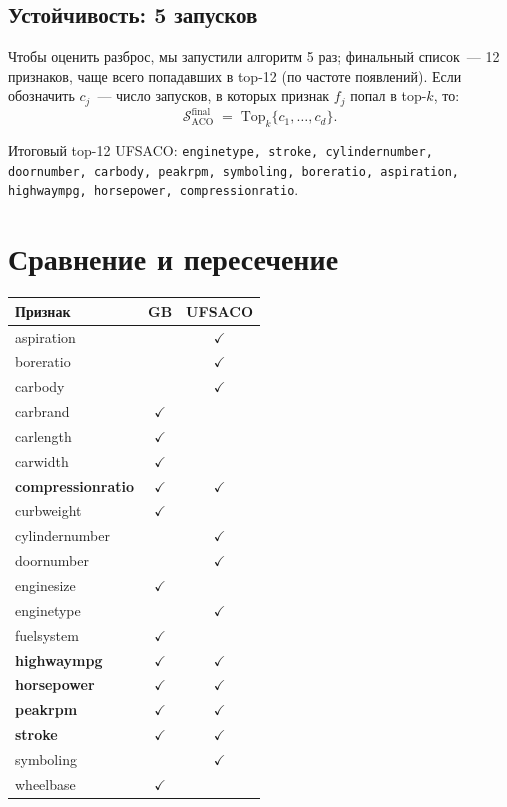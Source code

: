 \documentclass[12pt,a4paper]{article}
\begin{document}
\subsection{Устойчивость: 5 запусков}

Чтобы оценить разброс, мы запустили алгоритм 5 раз; финальный
список~--- 12 признаков, чаще всего попадавших в top-12 (по частоте
появлений). Если обозначить $c_j$~--- число запусков, в которых
признак $f_j$ попал в top-$k$, то:
\begin{equation}
  \mathcal{S}_{\text{ACO}}^{\text{final}}
    \;=\; \mathrm{Top}_k\bigl\{c_1, \dots, c_d\bigr\}.
\end{equation}

Итоговый top-12 UFSACO:
\texttt{enginetype, stroke, cylindernumber, doornumber, carbody,
peakrpm, symboling, boreratio, aspiration, highwaympg, horsepower,
compressionratio}.

\section{Сравнение и пересечение}

\begin{longtable}{lcc}
\toprule
\textbf{Признак} & \textbf{GB} & \textbf{UFSACO} \\
\midrule
\endhead
aspiration        &              & $\checkmark$ \\
boreratio         &              & $\checkmark$ \\
carbody           &              & $\checkmark$ \\
carbrand          & $\checkmark$ &              \\
carlength         & $\checkmark$ &              \\
carwidth          & $\checkmark$ &              \\
\textbf{compressionratio} & $\checkmark$ & $\checkmark$ \\
curbweight        & $\checkmark$ &              \\
cylindernumber    &              & $\checkmark$ \\
doornumber        &              & $\checkmark$ \\
enginesize        & $\checkmark$ &              \\
enginetype        &              & $\checkmark$ \\
fuelsystem        & $\checkmark$ &              \\
\textbf{highwaympg} & $\checkmark$ & $\checkmark$ \\
\textbf{horsepower} & $\checkmark$ & $\checkmark$ \\
\textbf{peakrpm}    & $\checkmark$ & $\checkmark$ \\
\textbf{stroke}     & $\checkmark$ & $\checkmark$ \\
symboling         &              & $\checkmark$ \\
wheelbase         & $\checkmark$ &              \\
\bottomrule
\end{longtable}
\end{document}
